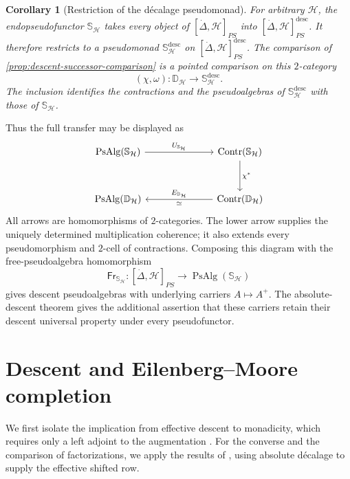 \documentclass[11pt,a4paper]{article}
\numberwithin{equation}{section}
\newtheorem{corollary}[corollary]{Corollary}
\theoremstyle{definition}
\theoremstyle{remark}
\newcommand{\Hcat}{\mathcal H}
\newcommand{\Dmon}{\mathbb D}
\newcommand{\Smon}{\mathbb S}
\newcommand{\Contr}{\operatorname{Contr}}
\newcommand{\PsAlg}{\operatorname{PsAlg}}
\begin{document}
\begin{corollary}[Restriction of the d\'ecalage pseudomonad]
\label{cor:restricted-successor}
For arbitrary $\Hcat$, the endopseudofunctor $\Smon_{\Hcat}$ takes
every object of $[\dot\Delta,\Hcat]_{PS}$ into
$[\dot\Delta,\Hcat]_{PS}^{\mathrm{desc}}$. It therefore restricts to a
pseudomonad $\Smon_{\Hcat}^{\mathrm{desc}}$ on
$[\dot\Delta,\Hcat]_{PS}^{\mathrm{desc}}$.
The comparison of \cref{prop:descent-successor-comparison} is a
pointed comparison on this $2$-category
\[
  (\chi,\omega)\colon\Dmon_{\Hcat}
       \longrightarrow\Smon_{\Hcat}^{\mathrm{desc}}.
\]
The inclusion identifies the contractions and the pseudoalgebras of $\Smon_{\Hcat}^{\mathrm{desc}}$ with those of
$\Smon_{\Hcat}$.
\end{corollary}

Thus the full transfer may be displayed as
\begin{equation}
\begin{tikzcd}[column sep=7.0em,row sep=3.2em]
  \PsAlg(\Smon_{\Hcat}) \ar[r,"U_{\Smon_{\Hcat}}"]
  & \Contr(\Smon_{\Hcat}) \ar[d,"\chi^*"]
  \\
  \PsAlg(\Dmon_{\Hcat})
  & \Contr(\Dmon_{\Hcat})
     \ar[l,"E_{\Dmon_{\Hcat}}"',"\simeq"]
\end{tikzcd}
\label{eq:descent-algebra-transfer}
\end{equation}
All arrows are homomorphisms of $2$-categories. The lower arrow
supplies the uniquely determined multiplication coherence; it also
extends every pseudomorphism and $2$-cell of contractions.
Composing this diagram with the free-pseudoalgebra homomorphism
\[
  \mathsf{Fr}_{\Smon_{\Hcat}}\colon
  [\dot\Delta,\Hcat]_{PS}\longrightarrow\PsAlg(\Smon_{\Hcat})
\]
gives descent pseudoalgebras with underlying carriers $A\mapsto A^+$.
The absolute-descent theorem gives the additional assertion that
these carriers retain their descent universal property under every
pseudofunctor.

\section{Descent and Eilenberg--Moore completion}
\label{sec:BR}

We first isolate the implication from effective descent to monadicity,
which requires only a left adjoint to the augmentation
\cite{Nunes2021}. For the converse and the comparison of
factorizations, we apply the results of \cite{Nunes2018}, using
absolute d\'ecalage to supply the effective shifted row.
\end{document}
